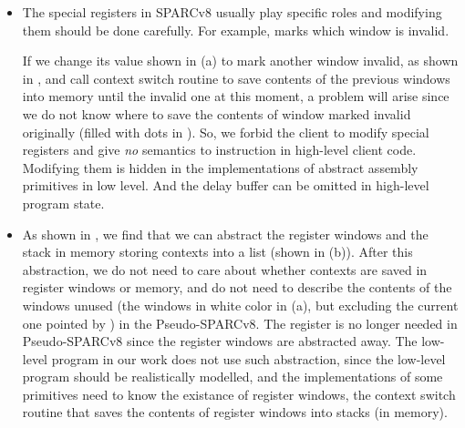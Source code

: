 \begin{itemize}
    \item
    The special registers in SPARCv8 usually play specific
    roles and modifying them should be done carefully.
    For example, \regwim{} marks which window is invalid.
    \begin{center}
        \vspace*{-0.5em}
        
        \vspace*{-0.5em}
        \label{fig:problem of modifying wim arbitrary}
    \end{center}
    If we change its value shown in
    \Fig{\ref{fig:Abstraction of Register Windows and Memory}} (a)
    to mark another window invalid, as shown in
    \Fig{\ref{fig:problem of modifying wim arbitrary}},
    and call context switch routine to
    save contents of the previous windows into memory
    until the invalid one at this moment,
    a problem will arise since we do not know
    where to save the contents of window marked
    invalid originally
    (filled with dots
    in \Fig{\ref{fig:problem of modifying wim arbitrary}}).
    So, we forbid the client
    to modify special registers and give \textit{no}
    semantics to instruction \cwr{} in high-level
    client code. Modifying them is hidden in the
    implementations of abstract assembly primitives in low level.
    And the delay buffer can be omitted in high-level
    program state.
    \item
    As shown in \Fig{\ref{fig:Abstraction of Register Windows and Memory}},
    we find that we can abstract the register windows
    and the stack in memory storing contexts
    into a list (shown in 
    \Fig{\ref{fig:Abstraction of Register Windows and Memory}} (b)).
    After this abstraction, we do not need to care about
    whether contexts are saved in register windows or
    memory, and do not need to describe the contents of the windows unused
    (the windows in white color in
    \Fig{\ref{fig:Abstraction of Register Windows and Memory}} (a),
    but excluding the current one pointed by \regcwp{})
    in the Pseudo-SPARCv8.
    The \regcwp{} register is no longer needed in 
    Pseudo-SPARCv8 since the register windows
    are abstracted away.
    The low-level program in our work does not use such
    abstraction, since the low-level program
    should be realistically modelled,
    and the implementations of some primitives
    need to know the existance of register windows,
    \eg{} the context switch routine
    that saves the contents
    of register windows into stacks (in memory).
\end{itemize}

